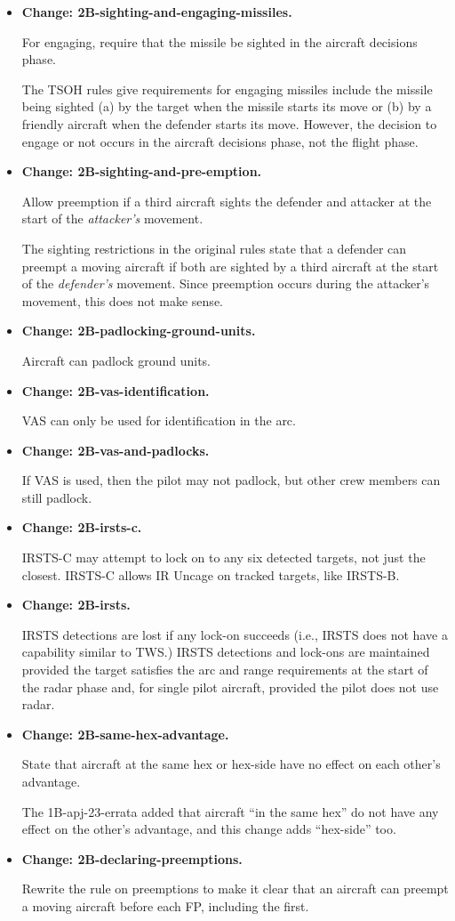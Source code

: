 \documentclass[10pt]{report}
\newcommand{\itemtag}[1]{\item \textbf{Change: #1.}\par}
\begin{document}
\begin{itemize}
    \itemtag{2B-sighting-and-engaging-missiles} For engaging, require that the missile be sighted in the aircraft decisions phase.
    
    The TSOH rules give requirements for engaging missiles include the missile being sighted (a) by the target when the missile starts its move or (b) by a friendly aircraft when the defender starts its move. However, the decision to engage or not occurs in the aircraft decisions phase, not the flight phase. 

    \itemtag{2B-sighting-and-pre-emption} Allow preemption if a third aircraft sights the defender and attacker at the start of the \emph{attacker's} movement.
    
    The sighting restrictions in the original rules state that a defender can preempt a moving aircraft if both are sighted by a third aircraft at the start of the \emph{defender's} movement. Since preemption occurs during the attacker's movement, this does not make sense.

    \itemtag{2B-padlocking-ground-units} Aircraft can padlock ground units.

    \itemtag{2B-vas-identification} VAS can only be used for identification in the  arc.
    
    \itemtag{2B-vas-and-padlocks} If VAS is used, then the pilot may not padlock, but other crew members can still padlock.

    \itemtag{2B-irsts-c} IRSTS-C may attempt to lock on to any six detected targets, not just the closest. IRSTS-C allows IR Uncage on tracked targets, like IRSTS-B.
    
    \itemtag{2B-irsts} IRSTS detections are lost if any lock-on succeeds (i.e., IRSTS does not have a capability similar to TWS.) IRSTS detections and lock-ons are maintained provided the target satisfies the arc and range requirements at the start of the radar phase and, for single pilot aircraft, provided the pilot does not use radar.

    \itemtag{2B-same-hex-advantage} State that aircraft at the same hex or hex-side have no effect on each other's advantage.  
    
    The 1B-apj-23-errata added that aircraft “in the same hex” do not have any effect on the other's advantage, and this change adds “hex-side” too.
    
    \itemtag{2B-declaring-preemptions} Rewrite the rule on preemptions to make it clear that an aircraft can preempt a moving aircraft before each FP, including the first.


\end{itemize}
\end{document}

